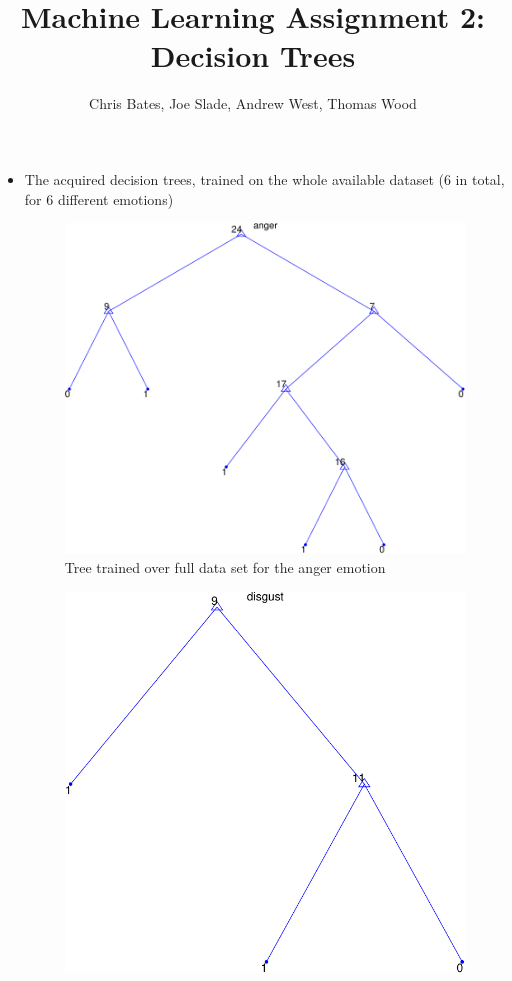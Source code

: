 \documentclass[a4paper]{article}
\title{Machine Learning Assignment 2: Decision Trees}
\author{Chris Bates, Joe Slade, Andrew West, Thomas Wood}
\begin{document}
\maketitle

\begin{itemize}
  \item The acquired decision trees, trained on the whole available dataset (6
    in total, for 6 different emotions)

  \begin{figure}[h]
    \centering
    \includegraphics[scale=0.5]{graph-anger}
    \caption{Tree trained over full data set for the anger emotion}
  \end{figure}
  \begin{figure}[h]
    \centering
    \includegraphics[scale=0.5]{graph-disgust}

\end{figure}
\end{itemize}
\end{document}
